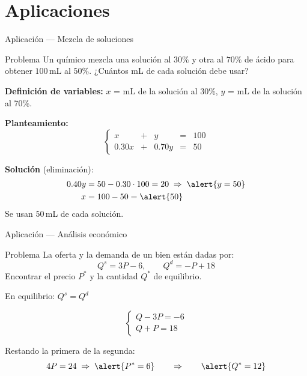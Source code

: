 \documentclass[11pt, aspectratio=169]{beamer}
\begin{document}
	\section{Aplicaciones}
	
	\begin{frame}{Aplicación — Mezcla de soluciones}
		\begin{exampleblock}{Problema}
			Un químico mezcla una solución al $30\%$ y otra al $70\%$ de ácido para
			obtener $100\,$mL al $50\%$.
			¿Cuántos mL de cada solución debe usar?
		\end{exampleblock}
		
		\pause
		\textbf{Definición de variables:} $x$ = mL de la solución al 30\%,
		$y$ = mL de la solución al 70\%.
		
		\pause
		\textbf{Planteamiento:}
		\[
		\left\{
		\begin{array}{rcrcr}
			x  & + &  y  & = & 100 \\[4pt]
			0.30x & + & 0.70y & = & 50
		\end{array}
		\right.
		\]
		
		\pause
		\textbf{Solución} (eliminación):
		\begin{align*}
			0.40y &= 50 - 0.30\cdot 100 = 20 \;\Rightarrow\; \alert{y = 50}\\
			x     &= 100 - 50 = \alert{50}
		\end{align*}
		Se usan $50\,$mL de cada solución.
	\end{frame}
	
	\begin{frame}{Aplicación — Análisis económico}
		\begin{exampleblock}{Problema}
			La oferta y la demanda de un bien están dadas por:
			\[
			Q^s = 3P - 6, \qquad Q^d = -P + 18
			\]
			Encontrar el precio $P^*$ y la cantidad $Q^*$ de equilibrio.
		\end{exampleblock}
		
		\pause
		En equilibrio: $Q^s = Q^d$
		
		\[
		\left\{
		\begin{array}{l}
			Q - 3P = -6 \\[4pt]
			Q + P = 18
		\end{array}
		\right.
		\]
		
		\pause
		Restando la primera de la segunda:
		\[
		4P = 24 \;\Rightarrow\; \alert{P^* = 6}
		\qquad\Rightarrow\qquad
		\alert{Q^* = 12}
		\]
	\end{frame}
	
\end{document}
